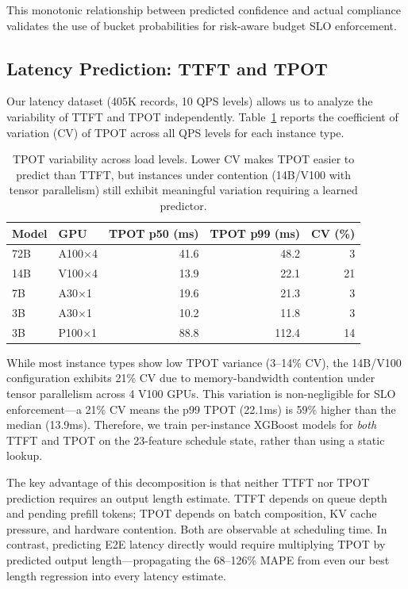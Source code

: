 \documentclass[letterpaper, anonymous, twocolumn, 10pt]{article}
\begin{document}
This monotonic relationship between predicted confidence and actual compliance validates the use of bucket probabilities for risk-aware budget SLO enforcement.

\subsection{Latency Prediction: TTFT and TPOT}

Our latency dataset (405K records, 10 QPS levels) allows us to analyze the variability of TTFT and TPOT independently.
Table~\ref{tab:tpot_stability} reports the coefficient of variation (CV) of TPOT across all QPS levels for each instance type.

\begin{table}[t]
\centering
\small
\caption{TPOT variability across load levels. Lower CV makes TPOT easier to predict than TTFT, but instances under contention (14B/V100 with tensor parallelism) still exhibit meaningful variation requiring a learned predictor.}
\label{tab:tpot_stability}
\begin{tabular}{llrrr}
\hline
Model & GPU & TPOT p50 (ms) & TPOT p99 (ms) & CV (\%) \\
\hline
72B & A100$\times$4 & 41.6 & 48.2 & 3 \\
14B & V100$\times$4 & 13.9 & 22.1 & 21 \\
7B & A30$\times$1 & 19.6 & 21.3 & 3 \\
3B & A30$\times$1 & 10.2 & 11.8 & 3 \\
3B & P100$\times$1 & 88.8 & 112.4 & 14 \\
\hline
\end{tabular}
\end{table}

While most instance types show low TPOT variance (3--14\% CV), the 14B/V100 configuration exhibits 21\% CV due to memory-bandwidth contention under tensor parallelism across 4 V100 GPUs. This variation is non-negligible for SLO enforcement---a 21\% CV means the p99 TPOT (22.1ms) is 59\% higher than the median (13.9ms). Therefore, we train per-instance XGBoost models for \emph{both} TTFT and TPOT on the 23-feature schedule state, rather than using a static lookup.

The key advantage of this decomposition is that neither TTFT nor TPOT prediction requires an output length estimate. TTFT depends on queue depth and pending prefill tokens; TPOT depends on batch composition, KV cache pressure, and hardware contention. Both are observable at scheduling time. In contrast, predicting E2E latency directly would require multiplying TPOT by predicted output length---propagating the 68--126\% MAPE from even our best length regression into every latency estimate.
\end{document}

